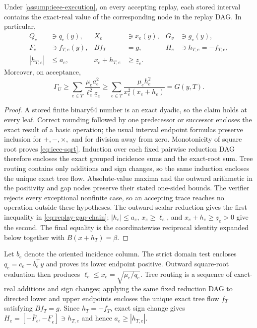 \begin{lemma}
\label{lem:ieee-inclusion}
Under \cref{assump:ieee-execution}, on every accepting replay, each stored
interval contains the exact-real value of the corresponding node in the replay
DAG.  In particular,
\begin{align*}
 Q_e&\ni q_e(y), & X_e&\ni x_e(y), & G_v&\ni g_v(y),\\
 F_e&\ni f_{T,e}(y), & Bf_T&=g,
 &H_e&\ni h_{T,e}=-f_{T,e},\\
 |h_{T,e}|&\le a_e,
 &x_e+h_{T,e}&\ge\underline z_e.&&
\end{align*}
Moreover, on acceptance,
\begin{equation}
 \Gamma_U\ge
 \sum_{e\in T}\frac{\mu_ea_e^2}{\ell_e^2\underline z_e}
 \ge
 \sum_{e\in T}\frac{\mu_eh_e^2}{x_e^2(x_e+h_e)}
 =G(y,T).
 \label{eq:replay-gap-chain}
\end{equation}
\end{lemma}

\begin{proof}
A stored finite binary64 number is an exact dyadic, so the claim holds at every
leaf.  Correct rounding followed by one predecessor or successor encloses the
exact result of a basic operation; the usual interval endpoint formulas preserve
inclusion for $+,-,\times,$ and for division away from zero.  Monotonicity of
square root proves \cref{eq:ieee-sqrt}.  Induction over each fixed pairwise
reduction DAG therefore encloses the exact grouped incidence sums and the
exact-root sum.  Tree routing contains only additions and sign changes, so the
same induction encloses the unique exact tree flow.  Absolute-value maxima and
the outward arithmetic in the positivity and gap nodes preserve their stated
one-sided bounds.  The verifier rejects every exceptional nonfinite case, so an
accepting trace reaches no operation outside these hypotheses.
The outward scalar reduction gives the first inequality in
\cref{eq:replay-gap-chain}; $|h_e|\le a_e$, $x_e\ge\ell_e$, and
$x_e+h_e\ge\underline z_e>0$ give the second.  The final equality is the
coordinatewise reciprocal identity expanded below together with
$B(x+h_T)=\beta$.
\end{proof}

Let $b_e$ denote the oriented incidence column.  The strict domain test encloses
$q_e=c_e-b_e^\top y$ and proves its lower endpoint positive.  Outward square-root
evaluation then produces $\ell_e\le x_e=\sqrt{\mu_e/q_e}$.  Tree routing is a
sequence of exact-real additions and sign changes; applying the same fixed
reduction DAG to directed lower and upper endpoints encloses the unique exact
 tree flow $f_T$ satisfying $Bf_T=g$.  Since $h_T=-f_T$, exact sign change
 gives $H_e=[-\overline F_e,-\underline F_e]\ni h_{T,e}$ and hence
 $a_e\ge|h_{T,e}|$.

